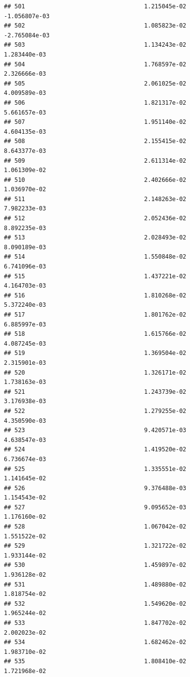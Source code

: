\documentclass[
]{article}
\begin{document}
\begin{verbatim}
## 501                                  1.215045e-02          -1.056807e-03
## 502                                  1.085823e-02          -2.765084e-03
## 503                                  1.134243e-02           1.283440e-03
## 504                                  1.768597e-02           2.326666e-03
## 505                                  2.061025e-02           4.009589e-03
## 506                                  1.821317e-02           5.661657e-03
## 507                                  1.951140e-02           4.604135e-03
## 508                                  2.155415e-02           8.643377e-03
## 509                                  2.611314e-02           1.061309e-02
## 510                                  2.402666e-02           1.036970e-02
## 511                                  2.148263e-02           7.982233e-03
## 512                                  2.052436e-02           8.892235e-03
## 513                                  2.028493e-02           8.090189e-03
## 514                                  1.550848e-02           6.741096e-03
## 515                                  1.437221e-02           4.164703e-03
## 516                                  1.810268e-02           5.372240e-03
## 517                                  1.801762e-02           6.885997e-03
## 518                                  1.615766e-02           4.087245e-03
## 519                                  1.369504e-02           2.315901e-03
## 520                                  1.326171e-02           1.738163e-03
## 521                                  1.243739e-02           3.176938e-03
## 522                                  1.279255e-02           4.350590e-03
## 523                                  9.420571e-03           4.638547e-03
## 524                                  1.419520e-02           6.736674e-03
## 525                                  1.335551e-02           1.141645e-02
## 526                                  9.376488e-03           1.154543e-02
## 527                                  9.095652e-03           1.176160e-02
## 528                                  1.067042e-02           1.551522e-02
## 529                                  1.321722e-02           1.933144e-02
## 530                                  1.459897e-02           1.936128e-02
## 531                                  1.489880e-02           1.818754e-02
## 532                                  1.549620e-02           1.965244e-02
## 533                                  1.847702e-02           2.002023e-02
## 534                                  1.682462e-02           1.983710e-02
## 535                                  1.808410e-02           1.721968e-02

\end{verbatim}
\end{document}
